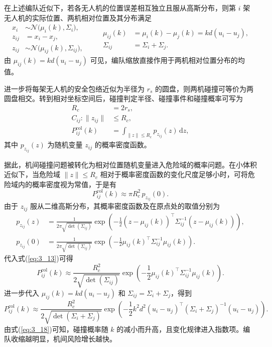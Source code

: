 在上述编队近似下，若各无人机的位置误差相互独立且服从高斯分布，则第 $i$ 架无人机的实际位置、两机相对位置及其分布满足
\[
\begin{aligned}
x_{i} &\sim \mathcal{N}\bigl(\mu_{i}(k), \Sigma_{i}\bigr),\\
z_{ij} &= x_{i} - x_{j},\\
z_{ij} &\sim \mathcal{N}\bigl(\mu_{ij}(k), \Sigma_{ij}\bigr),
\end{aligned}
\qquad
\begin{aligned}
\mu_{ij}(k) &= \mu_{i}(k) - \mu_{j}(k) = k d (u_{i} - u_{j}),\\
\Sigma_{ij} &= \Sigma_{i} + \Sigma_{j}.
\end{aligned}
\]
由 $\mu_{ij}(k)=k d (u_{i}-u_{j})$ 可见，编队缩放直接作用于两机相对位置分布的均值。

进一步将每架无人机的安全包络近似为半径为 $r_{s}$ 的圆盘，则两机碰撞可等价为两圆盘相交。转到相对坐标空间后，碰撞判定半径、碰撞事件和碰撞概率可写为
\[
\begin{aligned}
R_{c} &= 2 r_{s},\\
C_{ij}: \|z_{ij}\| &\le R_{c},\\
P_{ij}^{\mathrm{col}}(k) &= \int_{\|z\|\le R_{c}} p_{z_{ij}}(z) \, \mathrm{d}z,
\end{aligned}
\]
其中 $p_{z_{ij}}(z)$ 为随机变量 $z_{ij}$ 的概率密度函数。

据此，机间碰撞问题被转化为相对位置随机变量进入危险域的概率问题。在小体积近似下，当危险域 $\|z\|\le R_{c}$ 相对于概率密度函数的变化尺度足够小时，可将危险域内的概率密度视为常值，于是有
\begin{equation}
P_{ij}^{\mathrm{col}}(k) \approx \pi R_{c}^{2} \, p_{z_{ij}}(0).
\label{eq:3_13}
\end{equation}
由于 $z_{ij}$ 服从二维高斯分布，其概率密度函数及在原点处的取值分别为
\[
\begin{aligned}
p_{z_{ij}}(z) &= \frac{1}{2\pi \sqrt{\det(\Sigma_{ij})}}
\exp\!\left(-\frac{1}{2}(z-\mu_{ij}(k))^{\top}\Sigma_{ij}^{-1}(z-\mu_{ij}(k))\right),\\
p_{z_{ij}}(0) &= \frac{1}{2\pi \sqrt{\det(\Sigma_{ij})}}
\exp\!\left(-\frac{1}{2}\mu_{ij}(k)^{\top}\Sigma_{ij}^{-1}\mu_{ij}(k)\right).
\end{aligned}
\]
代入式(\ref{eq:3_13})可得
\[
P_{ij}^{\mathrm{col}}(k) \approx \frac{R_{c}^{2}}{2\sqrt{\det(\Sigma_{ij})}}
\exp\!\left(-\frac{1}{2}\mu_{ij}(k)^{\top}\Sigma_{ij}^{-1}\mu_{ij}(k)\right).
\]
进一步代入 $\mu_{ij}(k) = k d (u_{i}-u_{j})$ 和 $\Sigma_{ij} = \Sigma_{i}+\Sigma_{j}$，得到
\begin{equation}
P_{ij}^{\mathrm{col}}(k) \approx \frac{R_{c}^{2}}{2\sqrt{\det(\Sigma_{i}+\Sigma_{j})}}
\exp\!\left(-\frac{1}{2}k^{2}d^{2}(u_{i}-u_{j})^{\top}(\Sigma_{i}+\Sigma_{j})^{-1}(u_{i}-u_{j})\right).
\label{eq:3_18}
\end{equation}
由式(\ref{eq:3_18})可知，碰撞概率随 $k$ 的减小而升高，且变化规律进入指数项。编队收缩越明显，机间风险增长越快。


